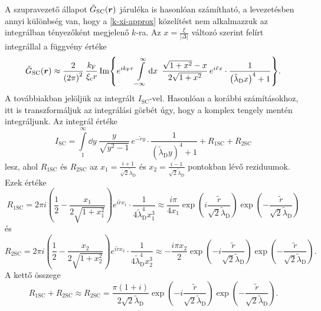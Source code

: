 \documentclass[a4paper,12pt,titlepage]{article}
\newcommand{\RR}{{\vb*{r}}}
\newcommand{\kF}{{k_\text{F}}}
\begin{document}
A szupravezető állapot $\tilde{G}_\text{SC}(\RR)$ járuléka is hasonlóan számítható, a levezetésben annyi különbség van, hogy a \eqref{k-xi-approx} közelítést nem alkalmazzuk az integrálban tényezőként megjelenő $k$-ra.  Az $x = \frac{\xi}{\left| \Delta \right|}$ változó szerint felírt integrállal a függvény értéke
\begin{equation}
	\tilde{G}_\text{SC}(\RR) \approx \frac{2}{\left( 2 \pi \right)^2} \, \frac{\kF}{\xi_\text{c} r} \Im{ e^{i \kF r} \int\limits_{-\infty}^\infty \dd{x} ~ \frac{\sqrt{1 + x^2} - x}{2 \sqrt{1 + x^2}} \, e^{i \tilde{r} x} \cdot \frac{1}{\left( \tilde{\lambda}_\text{D} x \right)^4 + 1} }.
\end{equation}
A továbbiakban jelöljük az integrált $I_\text{SC}$-vel.  Hasonlóan a korábbi számításokhoz, itt is transzformáljuk az integrálási görbét úgy, hogy a komplex tengely mentén integráljunk.  Az integrál értéke
\begin{equation}
	I_\text{SC} = \int\limits_1^\infty \dd{y} ~ \frac{y}{\sqrt{y^2 - 1}} \, e^{-\tilde{r} y} \cdot \frac{1}{\left( \tilde{\lambda}_\text{D} y \right)^4 + 1} + R_{1 \text{SC}} + R_{2 \text{SC}}
\end{equation}
lesz, ahol $R_{1 \text{SC}}$ és $R_{2 \text{SC}}$ az $x_1 = \frac{i + 1}{\sqrt{2} \tilde{\lambda}_\text{D}}$ és $x_2 = \frac{i - 1}{\sqrt{2} \tilde{\lambda}_\text{D}}$ pontokban lévő reziduumok.  Ezek értéke
\begin{equation}
	R_{1 \text{SC}} = 2 \pi i \left( \frac{1}{2} - \frac{x_1}{2 \sqrt{1 + x_1^2}} \right) e^{i \tilde{r} x_1} \cdot \frac{1}{4 \tilde{\lambda}_\text{D}^4 x_1^3} \approx \frac{i \pi}{4 x_1} \exp(i \frac{\tilde{r}}{\sqrt{2} \tilde{\lambda}_\text{D}}) \exp(-\frac{\tilde{r}}{\sqrt{2} \tilde{\lambda}_\text{D}})
\end{equation}
és
\begin{equation}
	R_{2 \text{SC}} = 2 \pi i \left( \frac{1}{2} - \frac{x_2}{2 \sqrt{1 + x_2^2}} \right) e^{i \tilde{r} x_2} \cdot \frac{1}{4 \tilde{\lambda}_\text{D}^4 x_2^3} \approx -\frac{i \pi x_2}{2} \exp(-i \frac{\tilde{r}}{\sqrt{2} \tilde{\lambda}_\text{D}}) \exp(-\frac{\tilde{r}}{\sqrt{2} \tilde{\lambda}_\text{D}}).
\end{equation}
A kettő összege
\begin{equation}
	R_{1 \text{SC}} + R_{2 \text{SC}} \approx R_{2 \text{SC}} = \frac{\pi \left( 1 + i \right)}{2 \sqrt{2} \tilde{\lambda}_\text{D}} \exp(-i \frac{\tilde{r}}{\sqrt{2} \tilde{\lambda}_\text{D}}) \exp(-\frac{\tilde{r}}{\sqrt{2} \tilde{\lambda}_\text{D}}).
\end{equation}
\end{document}
